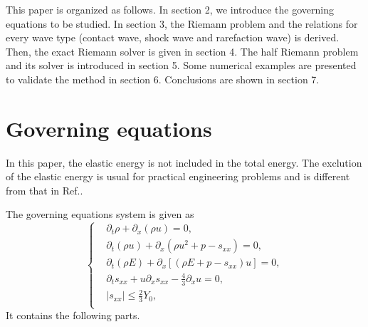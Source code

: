 \documentclass[review]{elsarticle}
\begin{document}
This paper is organized as follows. In section 2, we introduce the governing equations to be studied. In section 3, the Riemann problem and the relations for every wave type (contact wave, shock wave and rarefaction wave) is derived.  Then,  the exact Riemann solver  is given in section 4. The half Riemann problem and its solver is introduced in section 5.  Some numerical examples are presented to validate the method in section 6.  Conclusions are shown in section 7.

\section{Governing equations}
In this paper, the elastic energy is not included in the total energy. The exclution of the elastic energy is usual for practical engineering problems \cite{maire2013nominally} and is different from that in Ref.\cite{gavrilyuk2008modelling}.

The governing equations system is given as 
 \begin{equation}\label{eq:1d}
   \left\{ \begin{aligned}
       & \partial _t \rho +\partial_x(\rho u)=0,\\
       & \partial _t (\rho u)+\partial_x(\rho u^2 + p -s_{xx})=0,\\
       &\partial _t (\rho E)+\partial_x\left[(\rho E + p -s_{xx})u\right]=0,\\
       &\partial _t s_{xx}+u\partial_xs_{xx}-\frac{4}{3}\partial_x u=0,\\
& |s_{xx}|\leq \frac{2}{3}Y_{0}, \\
        \end{aligned}
  \right.
\end{equation}
It contains the following parts. 
\end{document}
